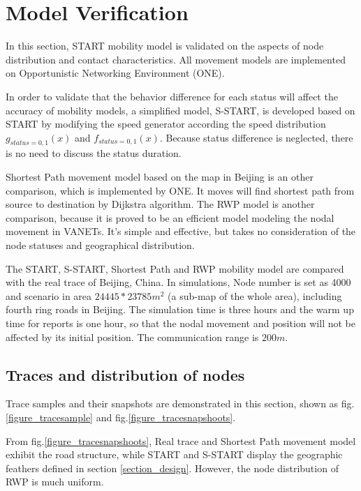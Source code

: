 \section{Model Verification}
\label{section_model_varification}
In this section, START mobility model is validated on the aspects of node distribution and contact characteristics. All movement models are implemented on Opportunistic Networking Environment (ONE)\cite{KeranenOtt-155}.

In order to  validate that the behavior difference for each status will affect the accuracy of mobility models, a simplified model, S-START, is developed based on START by modifying the speed generator according the speed distribution $g_{status=0,1}(x)$ and $f_{status=0,1}(x)$. Because status difference is neglected, there is no need to discuss the status duration.

Shortest Path movement model based on the map in Beijing is an other comparison, which is implemented by ONE.  It moves will find shortest path from source to destination by Dijkstra algorithm.
 The RWP model is another comparison, because it is proved to be an efficient model modeling the nodal movement in VANETs. It's simple and effective, but takes no consideration of the node statuses and geographical distribution.

The START, S-START, Shortest Path and RWP mobility model are compared with the real trace of Beijing, China.
In simulations, Node number is set as 4000 and scenario in area $24445*23785 m^2$ (a sub-map of the whole area), including fourth ring roads in Beijing. The simulation time is three hours and the warm up time for reports is one hour, so that the nodal movement and position will not be affected by its initial position. The communication range is $200m$.

\subsection{Traces and distribution of nodes}

Trace samples and their snapshots are demonstrated in this section, shown as fig. \ref{figure_tracesample} and fig.\ref{figure_tracesnapshoots}.

From fig.\ref{figure_tracesnapshoots}, Real trace and Shortest Path movement model exhibit the road structure, while START and S-START display the geographic feathers defined in section \ref{section_design}. However, the node distribution of RWP is much uniform.



